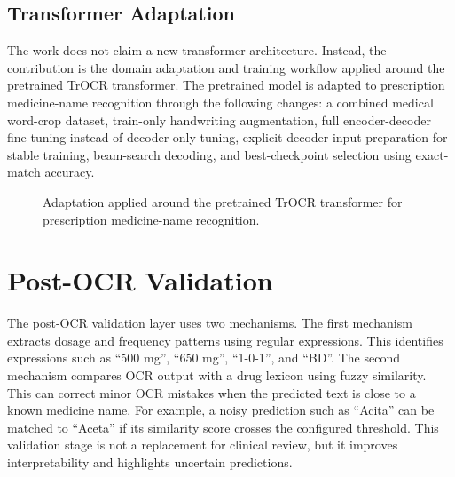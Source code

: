 \documentclass[modernstyle,12pt]{thesis}
\begin{document}
\subsection{Transformer Adaptation}

The work does not claim a new transformer architecture. Instead, the contribution is the domain adaptation and training workflow applied around the pretrained TrOCR transformer. The pretrained model is adapted to prescription medicine-name recognition through the following changes: a combined medical word-crop dataset, train-only handwriting augmentation, full encoder-decoder fine-tuning instead of decoder-only tuning, explicit decoder-input preparation for stable training, beam-search decoding, and best-checkpoint selection using exact-match accuracy.

\begin{figure}[h]
\centering
{}
\caption{Adaptation applied around the pretrained TrOCR transformer for prescription medicine-name recognition.}
\label{fig:trocr-adaptation}
\end{figure}

\section{Post-OCR Validation}

The post-OCR validation layer uses two mechanisms. The first mechanism extracts dosage and frequency patterns using regular expressions. This identifies expressions such as ``500 mg'', ``650 mg'', ``1-0-1'', and ``BD''. The second mechanism compares OCR output with a drug lexicon using fuzzy similarity. This can correct minor OCR mistakes when the predicted text is close to a known medicine name. For example, a noisy prediction such as ``Acita'' can be matched to ``Aceta'' if its similarity score crosses the configured threshold. This validation stage is not a replacement for clinical review, but it improves interpretability and highlights uncertain predictions.
\end{document}
